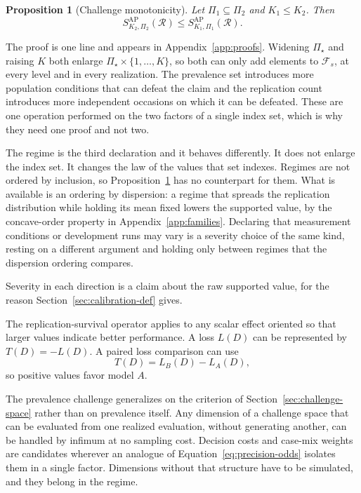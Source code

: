 \documentclass[11pt]{article}
\newcommand{\Regime}{\mathcal{R}}
\newcommand{\PSet}{\Pi_\star}
\newcommand{\RefSet}{\mathcal{F}}
\newtheorem{proposition}{Proposition}
\theoremstyle{remark}
\begin{document}
\begin{proposition}[Challenge monotonicity]
\label{prop:challenge-monotonicity}
Let $\Pi_1\subseteq\Pi_2$ and $K_1\leq K_2$. Then
\begin{equation}
S_{K_2,\Pi_2}^{\mathrm{AP}}(\Regime)
\leq
S_{K_1,\Pi_1}^{\mathrm{AP}}(\Regime).
\label{eq:challenge-monotonicity}
\end{equation}
\end{proposition}

The proof is one line and appears in Appendix~\ref{app:proofs}. Widening $\PSet$ and raising $K$ both enlarge $\PSet\times\{1,\ldots,K\}$, so both can only add elements to $\RefSet_s$, at every level and in every realization. The prevalence set introduces more population conditions that can defeat the claim and the replication count introduces more independent occasions on which it can be defeated. These are one operation performed on the two factors of a single index set, which is why they need one proof and not two.

The regime is the third declaration and it behaves differently. It does not enlarge the index set. It changes the law of the values that set indexes. Regimes are not ordered by inclusion, so Proposition~\ref{prop:challenge-monotonicity} has no counterpart for them. What is available is an ordering by dispersion: a regime that spreads the replication distribution while holding its mean fixed lowers the supported value, by the concave-order property in Appendix~\ref{app:families}. Declaring that measurement conditions or development runs may vary is a severity choice of the same kind, resting on a different argument and holding only between regimes that the dispersion ordering compares.

Severity in each direction is a claim about the raw supported value, for the reason Section~\ref{sec:calibration-def} gives.


The replication-survival operator applies to any scalar effect oriented so that larger values indicate better performance. A loss $L(D)$ can be represented by $T(D)=-L(D)$. A paired loss comparison can use
\[
T(D)=L_B(D)-L_A(D),
\]
so positive values favor model $A$.

The prevalence challenge generalizes on the criterion of Section~\ref{sec:challenge-space} rather than on prevalence itself. Any dimension of a challenge space that can be evaluated from one realized evaluation, without generating another, can be handled by infimum at no sampling cost. Decision costs and case-mix weights are candidates wherever an analogue of Equation~\eqref{eq:precision-odds} isolates them in a single factor. Dimensions without that structure have to be simulated, and they belong in the regime.
\end{document}

